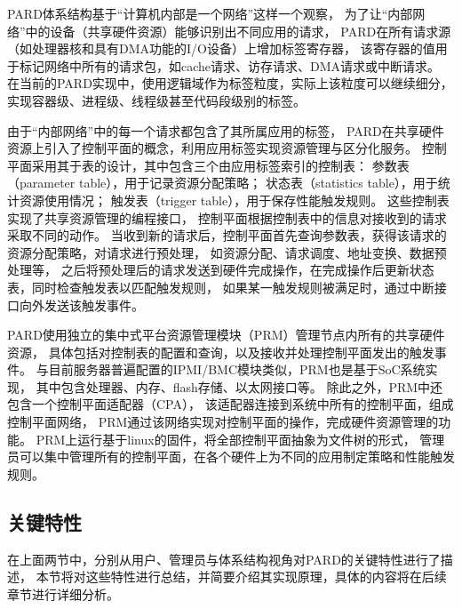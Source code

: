 PARD体系结构基于``计算机内部是一个网络''这样一个观察，
为了让``内部网络''中的设备（共享硬件资源）能够识别出不同应用的请求，
PARD在所有请求源（如处理器核和具有DMA功能的I/O设备）上增加标签寄存器，
该寄存器的值用于标记网络中所有的请求包，如cache请求、访存请求、DMA请求或中断请求。
在当前的PARD实现中，使用逻辑域作为标签粒度，实际上该粒度可以继续细分，
实现容器级、进程级、线程级甚至代码段级别的标签。

由于``内部网络''中的每一个请求都包含了其所属应用的标签，
PARD在共享硬件资源上引入了控制平面的概念，利用应用标签实现资源管理与区分化服务。
控制平面采用其于表的设计，其中包含三个由应用标签索引的控制表：
参数表（parameter table），用于记录资源分配策略；
状态表（statistics table），用于统计资源使用情况；
触发表（trigger table），用于保存性能触发规则。
这些控制表实现了共享资源管理的编程接口，
控制平面根据控制表中的信息对接收到的请求采取不同的动作。
当收到新的请求后，控制平面首先查询参数表，获得该请求的资源分配策略，对请求进行预处理，
如资源分配、请求调度、地址变换、数据预处理等，
之后将预处理后的请求发送到硬件完成操作，在完成操作后更新状态表，同时检查触发表以匹配触发规则，
如果某一触发规则被满足时，通过中断接口向外发送该触发事件。

PARD使用独立的集中式平台资源管理模块（PRM）管理节点内所有的共享硬件资源，
具体包括对控制表的配置和查询，以及接收并处理控制平面发出的触发事件。
与目前服务器普遍配置的IPMI/BMC模块类似，PRM也是基于SoC系统实现，
其中包含处理器、内存、flash存储、以太网接口等。
除此之外，PRM中还包含一个控制平面适配器（CPA），
该适配器连接到系统中所有的控制平面，组成控制平面网络，
PRM通过该网络实现对控制平面的操作，完成硬件资源管理的功能。
PRM上运行基于linux的固件，将全部控制平面抽象为文件树的形式，
管理员可以集中管理所有的控制平面，在各个硬件上为不同的应用制定策略和性能触发规则。



\subsection{关键特性}

在上面两节中，分别从用户、管理员与体系结构视角对PARD的关键特性进行了描述，
本节将对这些特性进行总结，并简要介绍其实现原理，具体的内容将在后续章节进行详细分析。

